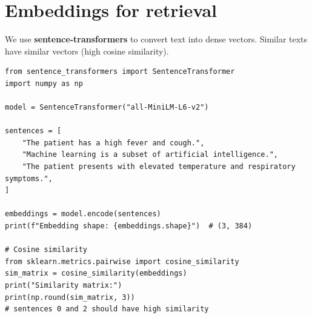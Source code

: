 \begin{center}
\end{center}

\section{Embeddings for retrieval}

We use \textbf{sentence-transformers} to convert text into dense vectors. Similar texts have similar vectors (high cosine similarity).

\begin{verbatim}
from sentence_transformers import SentenceTransformer
import numpy as np

model = SentenceTransformer("all-MiniLM-L6-v2")

sentences = [
    "The patient has a high fever and cough.",
    "Machine learning is a subset of artificial intelligence.",
    "The patient presents with elevated temperature and respiratory symptoms.",
]

embeddings = model.encode(sentences)
print(f"Embedding shape: {embeddings.shape}")  # (3, 384)

# Cosine similarity
from sklearn.metrics.pairwise import cosine_similarity
sim_matrix = cosine_similarity(embeddings)
print("Similarity matrix:")
print(np.round(sim_matrix, 3))
# sentences 0 and 2 should have high similarity
\end{verbatim}

